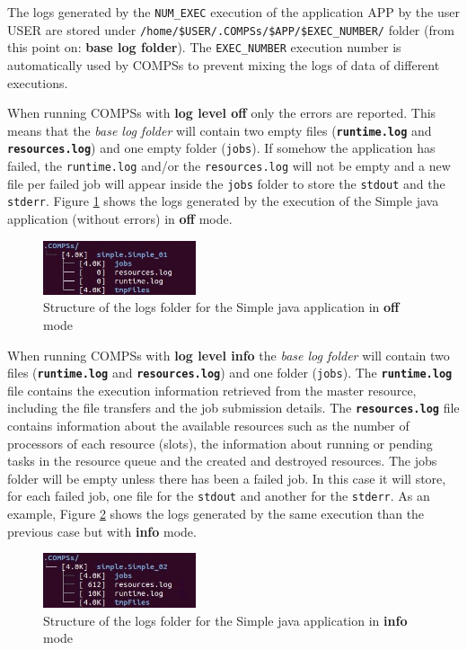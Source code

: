 The logs generated by the \texttt{NUM\_EXEC} execution of the application APP by the user USER are stored under
\texttt{/home/\$USER/.COMPSs/\$APP/\$EXEC\_NUMBER/} folder (from this point on: \textbf{base log folder}). The \texttt{EXEC\_NUMBER} execution number is 
automatically used by COMPSs to prevent mixing the logs of data of different executions. 

When running COMPSs with \textbf{log level off} only the errors are reported. This means that the \textit{base log folder} will 
contain two empty files (\texttt{\textbf{runtime.log}} and \texttt{\textbf{resources.log}}) and one empty folder (\texttt{jobs}). If somehow the 
application has failed, the \texttt{runtime.log} and/or the \texttt{resources.log} will not be empty and a new file per 
failed job will appear inside the \texttt{jobs} folder to store the \texttt{stdout} and the \texttt{stderr}. 
Figure \ref{fig:simple_log_off} shows the logs generated by the execution of the Simple java application (without errors) 
in \textbf{off} mode. 
\begin{figure}[!ht]
  \centering
    \includegraphics[width=0.4\textwidth]{./Sections/3_Results_and_Logs/Figures/simple_log_off.jpeg}
    \caption{Structure of the logs folder for the Simple java application in \textbf{off} mode}
    \label{fig:simple_log_off}
\end{figure}

When running COMPSs with \textbf{log level info} the \textit{base log folder} will contain two files (\texttt{\textbf{runtime.log}} and 
\texttt{\textbf{resources.log}}) and one folder (\texttt{jobs}). The \texttt{\textbf{runtime.log}} file contains the execution information retrieved 
from the master resource, including the file transfers and the job submission details. The \texttt{\textbf{resources.log}} file contains 
information about the available resources such as the number of processors of each resource (slots), the information about running or 
pending tasks in the resource queue and the created and destroyed resources. The jobs folder will be empty unless there has been a
failed job. In this case it will store, for each failed job, one file for the \texttt{stdout} and another for the \texttt{stderr}.
As an example, Figure \ref{fig:simple_log_info} shows the logs generated by the same execution than the previous case 
but with \textbf{info} mode. 
\begin{figure}[!ht]
  \centering
    \includegraphics[width=0.4\textwidth]{./Sections/3_Results_and_Logs/Figures/simple_log_info.jpeg}
    \caption{Structure of the logs folder for the Simple java application in \textbf{info} mode}
    \label{fig:simple_log_info}
\end{figure}

